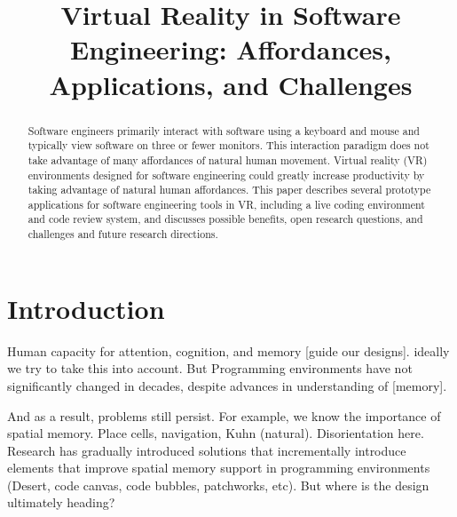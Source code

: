 \documentclass[conference]{IEEEtran}
\begin{document}
\title{Virtual Reality in Software Engineering: Affordances, Applications, and Challenges}

\author{
\and
{}
\and
{}
}

\maketitle
\begin{abstract}
Software engineers primarily interact with software using a keyboard and mouse and typically view software on three or fewer monitors.
This interaction paradigm does not take advantage of many affordances of natural human movement.
Virtual reality (VR) environments designed for software engineering could greatly increase productivity by taking advantage of natural human affordances.
This paper describes several prototype applications for software engineering tools in VR, including a live coding environment and code review system, and discusses possible benefits, open research questions, and challenges and future research directions.
\end{abstract}

\section{Introduction}

Human capacity for attention, cognition, and memory [guide our designs].
ideally we try to take this into account.
But
Programming environments have not significantly changed in decades, 
despite advances in understanding of [memory].

And as a result, problems still persist.  For example, we know the importance of spatial memory.
Place cells, navigation, Kuhn (natural). Disorientation here.  Research has gradually introduced solutions that incrementally introduce elements that improve spatial memory support in programming environments (Desert, code canvas, code bubbles, patchworks, etc).  But where is the design ultimately heading?
\end{document}
